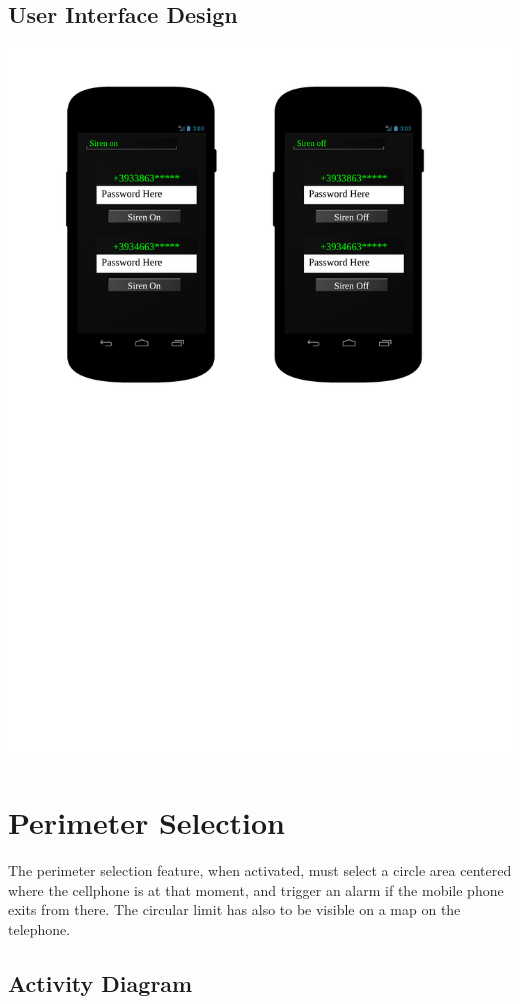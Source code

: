 \newpage
\subsection{User Interface Design}

\includegraphics[scale=0.7]{images/sirenonoff_mobile}


\section{Perimeter Selection}

The perimeter selection feature, when activated, must select a circle area
centered where the cellphone is at that moment, and trigger an alarm if the
mobile phone exits from there. The circular limit has also to be visible on a
map on the telephone.


\newpage
\subsection{Activity Diagram}

